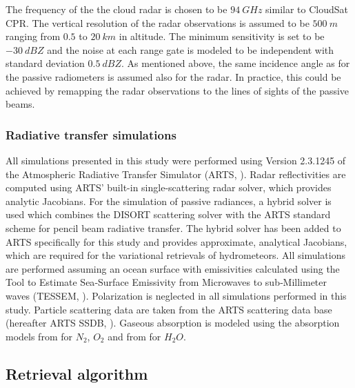 \documentclass[journal abbreviation, manuscript]{copernicus}
\begin{document}
The frequency of the the cloud radar is chosen to be $94\ \unit{GHz}$ similar to
CloudSat CPR. The vertical resolution of the radar observations is assumed to be
$500\ \unit{m}$ ranging from $0.5$ to $20\ \unit{km}$ in altitude. The minimum
sensitivity is set to be $-30\ \unit{dBZ}$ and the noise at each range gate is
modeled to be independent with standard deviation $0.5\ \unit{dBZ}$. As mentioned
above, the same incidence angle as for the passive radiometers is assumed also
for the radar. In practice, this could be achieved by remapping the radar
observations to the lines of sights of the passive beams.

\subsubsection{Radiative transfer simulations}
\label{sec:orge741b86}

All simulations presented in this study were performed using Version 2.3.1245 of
the Atmospheric Radiative Transfer Simulator (ARTS, \cite{arts18}). Radar
reflectivities are computed using ARTS' built-in single-scattering radar solver,
which provides analytic Jacobians. For the simulation of passive radiances, a
hybrid solver is used which combines the DISORT \citep{disort00} scattering
solver with the ARTS standard scheme for pencil beam radiative transfer. The
hybrid solver has been added to ARTS specifically for this study and provides
approximate, analytical Jacobians, which are required for the variational
retrievals of hydrometeors. All simulations are performed assuming an ocean
surface with emissivities calculated using the Tool to Estimate Sea‐Surface
Emissivity from Microwaves to sub‐Millimeter waves (TESSEM, \cite{prigent16}).
Polarization is neglected in all simulations performed in this study. Particle
scattering data are taken from the ARTS scattering data base (hereafter ARTS
SSDB, \citet{eriksson18}). Gaseous absorption is modeled using the absorption
models from \cite{rosenkranz93} for $N_2$, $O_2$ and from \cite{rosenkranz98}
for $H_2O$.


\subsection{Retrieval algorithm}
\label{sec:orgb528563}
\end{document}
